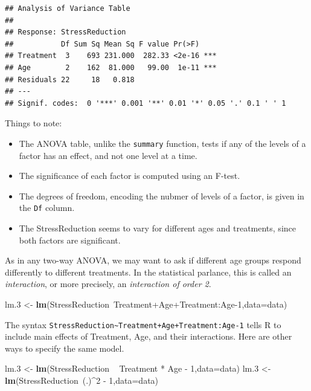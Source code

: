 \documentclass[]{book}
\newenvironment{Shaded}{\begin{snugshade}}{\end{snugshade}}
\newcommand{\KeywordTok}[1]{\textcolor[rgb]{0.13,0.29,0.53}{\textbf{{#1}}}}
\newcommand{\DataTypeTok}[1]{\textcolor[rgb]{0.13,0.29,0.53}{{#1}}}
\newcommand{\DecValTok}[1]{\textcolor[rgb]{0.00,0.00,0.81}{{#1}}}
\newcommand{\FloatTok}[1]{\textcolor[rgb]{0.00,0.00,0.81}{{#1}}}
\newcommand{\StringTok}[1]{\textcolor[rgb]{0.31,0.60,0.02}{{#1}}}
\newcommand{\NormalTok}[1]{{#1}}
\providecommand{\tightlist}{%
  \setlength{\itemsep}{0pt}\setlength{\parskip}{0pt}}
\theoremstyle{definition}
\theoremstyle{definition}
\theoremstyle{remark}
\begin{document}
\begin{verbatim}
## Analysis of Variance Table
## 
## Response: StressReduction
##           Df Sum Sq Mean Sq F value Pr(>F)    
## Treatment  3    693 231.000  282.33 <2e-16 ***
## Age        2    162  81.000   99.00  1e-11 ***
## Residuals 22     18   0.818                   
## ---
## Signif. codes:  0 '***' 0.001 '**' 0.01 '*' 0.05 '.' 0.1 ' ' 1
\end{verbatim}

Things to note:

\begin{itemize}
\tightlist
\item
  The ANOVA table, unlike the \texttt{summary} function, tests if any of
  the levels of a factor has an effect, and not one level at a time.
\item
  The significance of each factor is computed using an F-test.
\item
  The degrees of freedom, encoding the nubmer of levels of a factor, is
  given in the \texttt{Df} column.
\item
  The StressReduction seems to vary for different ages and treatments,
  since both factors are significant.
\end{itemize}

As in any two-way ANOVA, we may want to ask if different age groups
respond differently to different treatments. In the statistical
parlance, this is called an \emph{interaction}, or more precisely, an
\emph{interaction of order 2}.

\begin{Shaded}
\begin{Highlighting}[]
\NormalTok{lm}\FloatTok{.3} \NormalTok{<-}\StringTok{ }\KeywordTok{lm}\NormalTok{(StressReduction~Treatment+Age+Treatment:Age}\DecValTok{-1}\NormalTok{,}\DataTypeTok{data=}\NormalTok{data)}
\end{Highlighting}
\end{Shaded}

The syntax
\texttt{StressReduction\textasciitilde{}Treatment+Age+Treatment:Age-1}
tells R to include main effects of Treatment, Age, and their
interactions. Here are other ways to specify the same model.

\begin{Shaded}
\begin{Highlighting}[]
\NormalTok{lm}\FloatTok{.3} \NormalTok{<-}\StringTok{ }\KeywordTok{lm}\NormalTok{(StressReduction ~}\StringTok{ }\NormalTok{Treatment *}\StringTok{ }\NormalTok{Age -}\StringTok{ }\DecValTok{1}\NormalTok{,}\DataTypeTok{data=}\NormalTok{data)}
\NormalTok{lm}\FloatTok{.3} \NormalTok{<-}\StringTok{ }\KeywordTok{lm}\NormalTok{(StressReduction~(.)^}\DecValTok{2} \NormalTok{-}\StringTok{ }\DecValTok{1}\NormalTok{,}\DataTypeTok{data=}\NormalTok{data)}
\end{Highlighting}
\end{Shaded}
\end{document}
